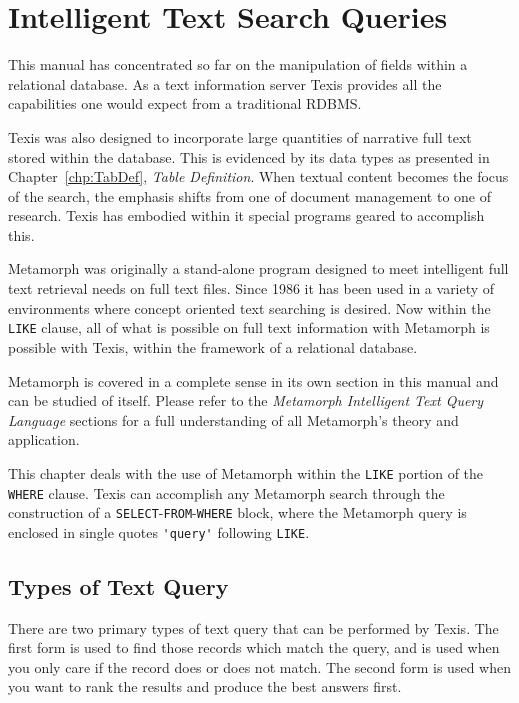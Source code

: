 \chapter{Intelligent Text Search Queries}{\label{Chp:MMLike}}

This manual has concentrated so far on the manipulation of fields
within a relational database.  As a text information server Texis
provides all the capabilities one would expect from a traditional
RDBMS.

Texis was also designed to incorporate large quantities of narrative
full text stored within the database.  This is evidenced by its data
types as presented in Chapter~\ref{chp:TabDef}, {\em Table
Definition}.  When textual content becomes the focus of the search,
the emphasis shifts from one of document management to one of
research.  Texis has embodied within it special programs geared to
accomplish this.

Metamorph was originally a stand-alone program designed to meet
intelligent full text retrieval needs on full text files.  Since 1986
it has been used in a variety of environments where concept oriented
text searching is desired.  Now within the \verb`LIKE` clause, all of what is
possible on full text information with Metamorph is possible with
Texis, within the framework of a relational database.

Metamorph is covered in a complete sense in its own section in this
manual and can be studied of itself.  Please refer to the {\em Metamorph
Intelligent Text Query Language} sections for a full understanding
of all Metamorph's theory and application.

This chapter deals with the use of Metamorph within the \verb`LIKE` portion
of the \verb`WHERE` clause.  Texis can accomplish any Metamorph search
through the construction of a \verb`SELECT`-\verb`FROM`-\verb`WHERE` block, where the
Metamorph query is enclosed in single quotes \verb`'query'` following
\verb`LIKE`.

\section{Types of Text Query}

There are two primary types of text query that can be performed by Texis.
The first form is used to find those records which match the query, and is
used when you only care if the record does or does not match.  The second
form is used when you want to rank the results and produce the best answers
first.

